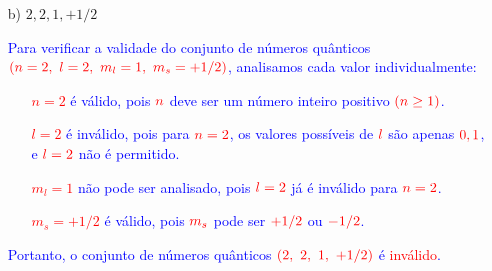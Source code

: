 \documentclass[a4paper, 12pt]{article}
\begin{document}
\begin{enumerate}
\begin{enumerate}
		      \item[b)] \(2, 2, 1, +1/2\)
		            \\[10pt]
		            \textcolor{blue}{
			            Para verificar a validade do conjunto de números quânticos \(\textcolor{red}{(n = 2,\ l = 2,\ m_l = 1,\ m_s = +1/2)}\), analisamos cada valor individualmente:
			            \begin{itemize}
				            \item[] \textcolor{red}{\(n = 2\)} é válido, pois \(\textcolor{red}{n}\) deve ser um número inteiro positivo \(\textcolor{red}{(n \geq 1)}\).
				            \item[] \textcolor{red}{\(l = 2\)} é inválido, pois para \(\textcolor{red}{n = 2}\), os valores possíveis de \(\textcolor{red}{l}\) são apenas \(\textcolor{red}{0, 1}\), e \(\textcolor{red}{l = 2}\) não é permitido.
				            \item[] \textcolor{red}{\(m_l = 1\)} não pode ser analisado, pois \(\textcolor{red}{l = 2}\) já é inválido para \(\textcolor{red}{n = 2}\).
				            \item[] \textcolor{red}{\(m_s = +1/2\)} é válido, pois \(\textcolor{red}{m_s}\) pode ser \(\textcolor{red}{+1/2}\) ou \(\textcolor{red}{-1/2}\).
			            \end{itemize}
			            \textcolor{blue}{Portanto, o conjunto de números quânticos \(\textcolor{red}{(2,\ 2,\ 1,\ +1/2)}\) é \textcolor{red}{inválido}.}
		            }
		            

\end{enumerate}
\end{enumerate}
\end{document}
